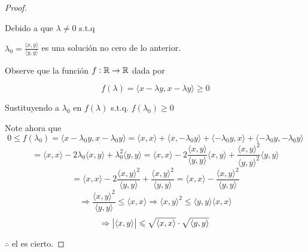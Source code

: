 \begin{proof}
\begin{enumerate}
        Debido a que $\lambda \neq 0$ s.t.q

        $\lambda_0 = \frac{\langle x,y \rangle}{\langle y,y \rangle}$ es una solución no cero de lo anterior.

        Observe que la función $f : \mathbb{R} \to \mathbb{R}$ dada por 

        \begin{equation*}
            f(\lambda) = \langle x - \lambda y , x - \lambda y \rangle \geqslant 0
        \end{equation*}

        Sustituyendo a $\lambda_0$ en $f(\lambda) $ s.t.q. $f(\lambda_0) \geqslant 0 $

        Note ahora que
        \begin{equation*}
            0 \leqslant f(\lambda_0) = \langle x - \lambda_0 y , x - \lambda_0 y \rangle = \langle x , x \rangle + \langle x , - \lambda_0 y \rangle  + \langle - \lambda_0 y , x \rangle + \langle  - \lambda_0 y , - \lambda_0 y \rangle 
        \end{equation*}
        \begin{equation*}
            = \langle x , x \rangle -2 \lambda_0 \langle x , y \rangle +{\lambda}_{0}^{2} \langle y , y \rangle
            = \langle x , x \rangle -2 \frac{\langle x,y \rangle}{\langle y,y \rangle} \langle x , y \rangle +\frac{{\langle x,y \rangle}^{2}}{{\langle y,y \rangle}^{2}} \langle y , y \rangle 
        \end{equation*}
        \begin{equation*}
            = \langle x , x \rangle -2 \frac{{\langle x,y \rangle}^{2}}{\langle y,y \rangle} +\frac{{\langle x,y \rangle}^{2}}{\langle y,y \rangle} = \langle x , x \rangle - \frac{{\langle x,y \rangle}^{2}}{\langle y,y \rangle} 
        \end{equation*}
        \begin{equation*}
            \Rightarrow \frac{{\langle x,y \rangle}^{2}}{\langle y,y \rangle}  \leqslant \langle x , x \rangle \Rightarrow {\langle x,y \rangle}^{2} \leqslant \langle y,y \rangle \langle x , x \rangle 
        \end{equation*}
        \begin{equation*}
        \Rightarrow \abs{\langle x,y \rangle} \leqslant \sqrt{\langle x,x \rangle} \cdot \sqrt{\langle y,y \rangle}
    \end{equation*}
        
    \end{enumerate}

    $\therefore$ el  es cierto.
\end{proof}

